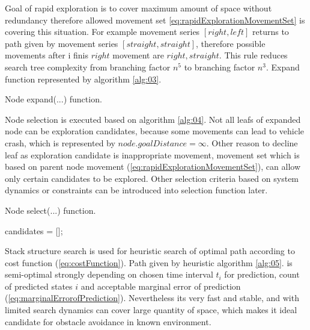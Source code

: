 Goal of rapid exploration is to cover maximum amount of space without redundancy therefore allowed movement set \ref{eq:rapidExplorationMovementSet} is covering this situation. For example movement series $[right,left]$ returns to path given by movement series $[straight,straight]$, therefore possible movements after i finis $right$ movement are $right,straight$. This rule reduces search tree complexity from branching factor $n^5$ to branching factor $n^3$. Expand function represented by algorithm \ref{alg:03}.
\\
\begin{algorithm}[H]
\caption{Node expand(...) function.}
\label{alg:03}
\end{algorithm}
Node selection is executed based on algorithm \ref{alg:04}. Not all leafs of expanded node can be exploration candidates, because some movements can lead to vehicle crash, which is represented by $node.goalDistance = \infty$. Other reason to decline leaf as exploration candidate is inappropriate movement, movement set which is based on parent node movement (\ref{eq:rapidExplorationMovementSet}), can allow only certain candidates to be explored. Other selection criteria based on system dynamics or constraints can be introduced into selection function later.

\begin{algorithm}[H]
    \caption{Node select(...) function.}
    \label{alg:04}
    candidates = [];\\
\end{algorithm}
\newpage\noindent  Stack structure search is used for heuristic search of optimal path according to cost function (\ref{eq:costFunction}). Path given by heuristic algorithm \ref{alg:05}. is semi-optimal strongly depending on chosen time interval $t_i$ for prediction, count of predicted states $i$ and acceptable marginal error of prediction (\ref{eq:marginalErrorofPrediction}). Nevertheless its very fast and stable, and with limited search dynamics can cover large quantity of space, which makes it ideal candidate for obstacle avoidance in known environment. 

